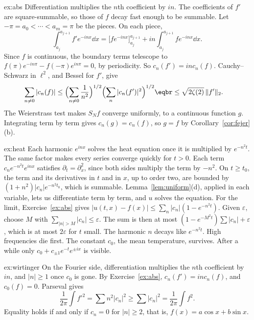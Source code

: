 \begin{solution}{ex:abs}
\idea Differentiation multiplies the $n$th coefficient by $in$. The coefficients of $f'$ are square-summable, so those of $f$ decay fast enough to be summable.
\writeup Let $-\pi=a_0<\cdots<a_m=\pi$ be the pieces. On each piece,
\[
\int_{a_j}^{a_{j+1}}f'e^{-inx}\dd x=\bigl[fe^{-inx}\bigr]_{a_j}^{a_{j+1}}+in\int_{a_j}^{a_{j+1}}fe^{-inx}\dd x.
\]
Since $f$ is continuous, the boundary terms telescope to $f(\pi)e^{-in\pi}-f(-\pi)e^{in\pi}=0$, by periodicity. So $c_n(f')=inc_n(f)$. Cauchy--Schwarz in $\ell^2$, and Bessel for $f'$, give
\[
\begin{aligned}\sum_{n\ne0}|c_n(f)|&\le\Bigl(\sum_{n\ne0}\frac1{n^2}\Bigr)^{1/2}\Bigl(\sum_n|c_n(f')|^2\Bigr)^{1/2}\eqbr\le\sqrt{2\zeta(2)}\,\|f'\|_2.\end{aligned}
\]
The Weierstrass test makes $S_Nf$ converge uniformly, to a continuous function $g$. Integrating term by term gives $c_n(g)=c_n(f)$, so $g=f$ by Corollary~\ref{cor:fejer}(b).
\end{solution}

\begin{solution}{ex:heat}
\idea Each harmonic $e^{inx}$ solves the heat equation once it is multiplied by $e^{-n^2t}$. The same factor makes every series converge quickly for $t>0$.
\writeup Each term $c_ne^{-n^2t}e^{inx}$ satisfies $\partial_t=\partial_x^2$, since both sides multiply the term by $-n^2$. On $t\ge t_0$, the term and its derivatives in $t$ and in $x$, up to order two, are bounded by $(1+n^2)|c_n|e^{-n^2t_0}$, which is summable. Lemma~\ref{lem:uniform}(d), applied in each variable, lets us differentiate term by term, and $u$ solves the equation. For the limit, Exercise~\ref{ex:abs} gives $|u(t,x)-f(x)|\le\sum_n|c_n|(1-e^{-n^2t})$. Given $\varepsilon$, choose $M$ with $\sum_{|n|>M}|c_n|\le\varepsilon$. The sum is then at most $(1-e^{-M^2t})\sum|c_n|+\varepsilon$, which is at most $2\varepsilon$ for $t$ small. The harmonic $n$ decays like $e^{-n^2t}$. High frequencies die first. The constant $c_0$, the mean temperature, survives. After a while only $c_0+c_{\pm1}e^{-t}e^{\pm ix}$ is visible.
\end{solution}

\begin{solution}{ex:wirtinger}
\idea On the Fourier side, differentiation multiplies the $n$th coefficient by $in$, and $|n|\ge1$ once $c_0$ is gone.
\writeup By Exercise~\ref{ex:abs}, $c_n(f')=inc_n(f)$, and $c_0(f)=0$. Parseval gives
\[
\frac1{2\pi}\int f'^2=\sum n^2|c_n|^2\ge\sum|c_n|^2=\frac1{2\pi}\int f^2.
\]
Equality holds if and only if $c_n=0$ for $|n|\ge2$, that is, $f(x)=a\cos x+b\sin x$.
\end{solution}

